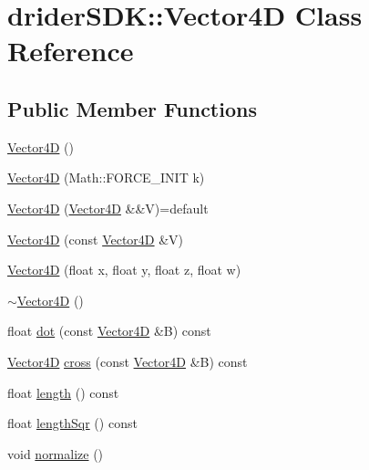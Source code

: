 \hypertarget{classdrider_s_d_k_1_1_vector4_d}{}\section{drider\+S\+DK\+:\+:Vector4D Class Reference}
\label{classdrider_s_d_k_1_1_vector4_d}
\subsection*{Public Member Functions}
\begin{DoxyCompactItemize}
\item 
\hyperlink{classdrider_s_d_k_1_1_vector4_d_af010e3865425352f4ab21df1144cffcf}{Vector4D} ()
\item 
\hyperlink{classdrider_s_d_k_1_1_vector4_d_aeff81eebdc91a9adfb959a66767a6281}{Vector4D} (Math\+::\+F\+O\+R\+C\+E\+\_\+\+I\+N\+IT k)
\item 
\hyperlink{classdrider_s_d_k_1_1_vector4_d_a2cd19b93232ceec414455d18472fc438}{Vector4D} (\hyperlink{classdrider_s_d_k_1_1_vector4_d}{Vector4D} \&\&V)=default
\item 
\hyperlink{classdrider_s_d_k_1_1_vector4_d_a985e70f8324e74ea261429d9ed0d8175}{Vector4D} (const \hyperlink{classdrider_s_d_k_1_1_vector4_d}{Vector4D} \&V)
\item 
\hyperlink{classdrider_s_d_k_1_1_vector4_d_a942402976cfe8940344b2e8d0367338e}{Vector4D} (float x, float y, float z, float w)
\item 
\hyperlink{classdrider_s_d_k_1_1_vector4_d_ae01427a60f8ea96ac706e8d313503d87}{$\sim$\+Vector4D} ()
\item 
float \hyperlink{classdrider_s_d_k_1_1_vector4_d_aa8d1f7fff12b2ac119cadc3938652fed}{dot} (const \hyperlink{classdrider_s_d_k_1_1_vector4_d}{Vector4D} \&B) const
\item 
\hyperlink{classdrider_s_d_k_1_1_vector4_d}{Vector4D} \hyperlink{classdrider_s_d_k_1_1_vector4_d_a81812e2af1876abb13a489f5264d9515}{cross} (const \hyperlink{classdrider_s_d_k_1_1_vector4_d}{Vector4D} \&B) const
\item 
float \hyperlink{classdrider_s_d_k_1_1_vector4_d_acef00dfefbd4491c7467468e7cb4c8c3}{length} () const
\item 
float \hyperlink{classdrider_s_d_k_1_1_vector4_d_a1ddcf3265baa39efedaa78e650ecabc0}{length\+Sqr} () const
\item 
void \hyperlink{classdrider_s_d_k_1_1_vector4_d_af833f447b91791df7d2a153bf77e127b}{normalize} ()
\item 

\end{DoxyCompactItemize}
